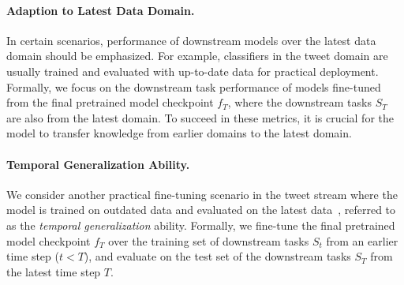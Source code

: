 \paragraph{Adaption to Latest Data Domain.} 
In certain scenarios, performance of downstream models over the latest data domain should be emphasized. For example, classifiers in the tweet domain are usually trained and evaluated with up-to-date data for practical deployment. Formally, we focus on the downstream task performance of models fine-tuned from the final pretrained model checkpoint $f_T$, where the downstream tasks $S_T$ are also from the latest domain. To succeed in these metrics, it is crucial for the model to transfer knowledge from earlier domains to the latest domain. 


\paragraph{Temporal Generalization Ability.}
We consider another practical fine-tuning scenario in the tweet stream where the model is trained on outdated data and evaluated on the latest data~\cite{Rijhwani2020TemporallyInformedAO, Huang2018ExaminingTI}, referred to as the \textit{temporal generalization} ability. %
Formally, we fine-tune the final pretrained model checkpoint $f_T$ over the training set of downstream tasks $S_t$ from an earlier time step ($t < T$), and evaluate on the test set of the downstream tasks $S_T$ from the latest time step $T$.









